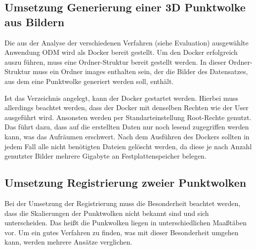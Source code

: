 \documentclass[12pt,titlepage, twoside]{article}
\begin{document}
\subsection{Umsetzung Generierung einer 3D Punktwolke aus Bildern}
\label{sec:realisierung:implementierung1}

Die aus der Analyse der verschiedenen Verfahren (siehe Evaluation) ausgewählte Anwendung ODM wird als Docker bereit gestellt. Um den Docker erfolgreich auszu führen, muss eine Ordner-Struktur bereit gestellt werden.
In dieser Ordner-Struktur muss ein Ordner \glqq images\grqq{} enthalten sein, der die Bilder des Datensatzes, aus dem eine Punktwolke generiert werden soll, enthält.

Ist das Verzeichnis angelegt, kann der Docker gestartet werden. Hierbei muss allerdings beachtet werden, dass der Docker mit denselben Rechten wie der User ausgeführt wird. 
Ansonsten werden per Standarteinstellung Root-Rechte genutzt.
Das führt dazu, dass auf die erstellten Daten nur noch lesend zugegriffen werden kann, was das Aufräumen erschwert.
Nach dem Ausführen des Dockers sollten in jedem Fall alle nicht benötigten Dateien gelöscht werden, da diese je nach Anzahl genutzter Bilder mehrere Gigabyte an Festplattenspeicher belegen.

\subsection{Umsetzung Registrierung zweier Punktwolken}
\label{sec:realisierung:implementierung2}

Bei der Umsetzung der Registrierung muss die Besonderheit beachtet werden, dass die Skalierungen der Punktwolken nicht bekannt sind und sich unterscheiden. 
Das heißt die Punkwolken liegen in unterschiedlichen Maaßtäben vor.  
Um ein gutes Verfahren zu finden, was mit dieser Besonderheit umgehen kann, werden mehrere Ansätze verglichen.
\end{document}
